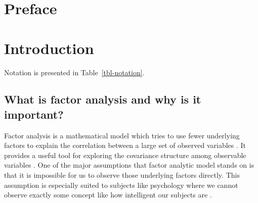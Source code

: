 \documentclass[
  a4paper,
  oneside,
  openany,
  12pt,
  onecolumn]{book}
\renewcommand*\contentsname{Table of contents}
\newcommand\contentsname{Table of contents}
\theoremstyle{plain}
\theoremstyle{remark}
\begin{document}
\renewcommand*\contentsname{Table of contents}
{
\setcounter{tocdepth}{2}
\tableofcontents
}
\listoffigures
{}
\listoftables
{}
\mainmatter
{}

\chapter*{Preface}\label{preface}



\chapter{Introduction}\label{introduction}

Notation is presented in Table~\ref{tbl-notation}.

\section{What is factor analysis and why is it
important?}\label{what-is-factor-analysis-and-why-is-it-important}

Factor analysis is a mathematical model which tries to use fewer
underlying factors to explain the correlation between a large set of
observed variables \citep{mardiaMultivariateAnalysis1979}. It provides a
useful tool for exploring the covariance structure among observable
variables \citep{hiroseSparseEstimationNonconcave2015}. One of the major
assumptions that factor analytic model stands on is that it is
impossible for us to observe those underlying factors directly. This
assumption is especially suited to subjects like psychology where we
cannot observe exactly some concept like how intelligent our subjects
are \citep{mardiaMultivariateAnalysis1979}.
\end{document}
